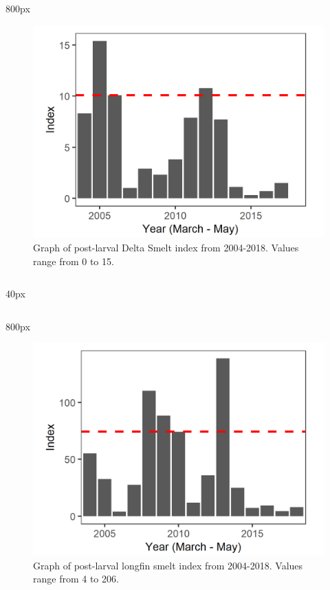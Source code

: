 \documentclass[
]{book}
\begin{document}
\begin{column}{800px\textwidth}
\begin{figure}
\includegraphics[width=15.25in]{figures/20mm_DSM_recent} \caption{Graph of post-larval Delta Smelt index from 2004-2018. Values range from 0 to 15.}\label{fig:unnamed-chunk-43}
\end{figure}
\end{column}

\begin{column}{40px\textwidth}
~
\end{column}

\begin{column}{800px\textwidth}
\begin{figure}
\includegraphics[width=15.25in]{figures/20mm_LFS_recent} \caption{Graph of post-larval longfin smelt index from 2004-2018. Values range from 4 to 206.}\label{fig:unnamed-chunk-44}
\end{figure}
\end{column}
\end{document}

